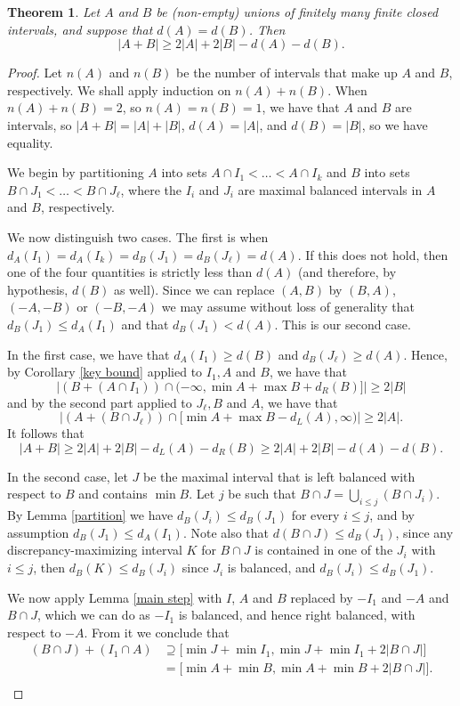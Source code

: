 \documentclass[11pt,reqno]{amsart}
\newtheorem{theorem}{Theorem}[section]
\theoremstyle{definition}
\def\supset{\supseteq}
\begin{document}
\begin{theorem}\label{offdiagonal main2}
Let $A$ and $B$ be (non-empty) unions of finitely many finite closed intervals, and suppose that $d(A)=d(B)$. Then
\[|A+B|\geq 2|A|+2|B|-d(A)-d(B).\]
\end{theorem}

\begin{proof} Let $n(A)$ and $n(B)$ be the number of intervals that make up $A$ and $B$, respectively. We shall apply induction on $n(A)+n(B)$. When $n(A)+n(B)=2$, so $n(A)=n(B)=1$, we have that $A$ and $B$ are intervals, so $|A+B|=|A|+|B|$, $d(A)=|A|$, and $d(B)=|B|$, so we have equality.

We begin by partitioning $A$ into sets $A\cap I_1 < \dots < A\cap I_k$ and $B$ into sets $B\cap J_1<\dots<B\cap J_\ell$, where the $I_i$ and $J_i$ are maximal balanced intervals in $A$ and $B$, respectively.

We now distinguish two cases. The first is when $d_A(I_1)=d_A(I_k)=d_B(J_1)=d_B(J_\ell)=d(A)$. If this does not hold, then one of the four quantities is strictly less than $d(A)$ (and therefore, by hypothesis, $d(B)$ as well). Since we can replace $(A,B)$ by $(B,A)$, $(-A,-B)$ or $(-B,-A)$ we may assume without loss of generality that $d_B(J_1)\leq d_A(I_1)$ and that $d_B(J_1)<d(A)$. This is our second case.

In the first case, we have that $d_A(I_1)\geq d(B)$ and $d_B(J_\ell)\geq d(A)$. Hence, by Corollary \ref{key bound} applied to $I_1, A$ and $B$, we have that 
\[\big|(B+(A\cap I_1))\cap(-\infty, \min A+\max B+d_R(B)]\big|\geq 2|B|\] 
and by the second part applied to $J_\ell,B$ and $A$, we have that
\[\big|(A+(B\cap J_\ell))\cap[\min A+\max B-d_L(A),\infty)\big|\geq 2|A|.\]
It follows that 
\[|A+B|\geq 2|A|+2|B|-d_L(A)-d_R(B)\geq 2|A|+2|B|-d(A)-d(B).\]

In the second case, let $J$ be the maximal interval that is left balanced with respect to $B$ and contains $\min B$. Let $j$ be such that $B\cap J=\bigcup_{i\leq j}(B\cap J_i)$. By Lemma \ref{partition} we have $d_B(J_i)\leq d_B(J_1)$ for every $i\leq j$, and by assumption $d_B(J_1)\leq d_A(I_1)$. Note also that $d(B\cap J)\leq d_B(J_1)$, since any discrepancy-maximizing interval $K$ for $B\cap J$ is contained in one of the $J_i$ with $i\leq j$, then $d_B(K)\leq d_B(J_i)$ since $J_i$ is balanced, and $d_B(J_i)\leq d_B(J_1)$.

We now apply Lemma \ref{main step} with $I$, $A$ and $B$ replaced by $-I_1$ and $-A$ and $B\cap J$, which we can do as $-I_1$ is balanced, and hence right balanced, with respect to $-A$. From it we conclude that
\begin{align*}
(B\cap J)+(I_1\cap A)&\supset\big[\min J+\min I_1, \min J+\min I_1+2|B\cap J|\big]\\
&=\big[\min A+\min B,\min A+\min B+2|B\cap J|\big].\\
\end{align*}


\end{proof}
\end{document}
